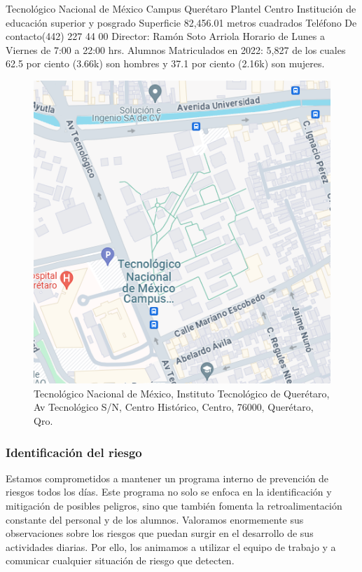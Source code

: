     Tecnológico Nacional de México Campus Querétaro Plantel Centro
    Institución de educación superior y posgrado
    Superficie 82,456.01 metros cuadrados 
    Teléfono De contacto(442) 227 44 00
    Director: Ramón Soto Arriola
    Horario de Lunes a Viernes de 7:00 a 22:00 hrs.
    Alumnos Matriculados en 2022: 5,827 de los cuales 62.5 por ciento (3.66k) son hombres y 37.1 por ciento (2.16k) son mujeres.
    
    \begin{figure}[H]
        \centering
        \includegraphics[scale=0.4]{35/Img/mapaITQ.png}
        \caption{Tecnológico Nacional de México, Instituto Tecnológico de Querétaro, Av Tecnológico S/N, Centro Histórico, Centro, 76000, Querétaro, Qro.}
        \label{fig:mapaITQ}
    \end{figure}
    
    \subsubsection{Identificación del riesgo}
    
    Estamos comprometidos a mantener un programa interno de prevención de riesgos todos los días. Este programa no solo se enfoca en la identificación y mitigación de posibles peligros, sino que también fomenta la retroalimentación constante del personal y de los alumnos. Valoramos enormemente sus observaciones sobre los riesgos que puedan surgir en el desarrollo de sus actividades diarias. Por ello, los animamos a utilizar el equipo de trabajo y a comunicar cualquier situación de riesgo que detecten.
    
